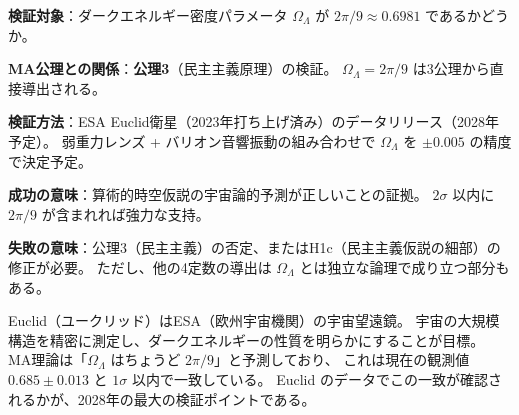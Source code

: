 \begin{experimentbox}[Euclid 2028 $\to$ $\Omega_\Lambda = 2\pi/9$（公理3の検証）]
\textbf{検証対象}：ダークエネルギー密度パラメータ $\Omega_\Lambda$ が
$2\pi/9 \approx 0.6981$ であるかどうか。

\medskip
\textbf{MA公理との関係}：\textbf{公理3}（民主主義原理）の検証。
$\Omega_\Lambda = 2\pi/9$ は3公理から直接導出される。

\medskip
\textbf{検証方法}：ESA Euclid衛星（2023年打ち上げ済み）のデータリリース（2028年予定）。
弱重力レンズ + バリオン音響振動の組み合わせで $\Omega_\Lambda$ を $\pm 0.005$ の精度で決定予定。

\medskip
\textbf{成功の意味}：算術的時空仮説の宇宙論的予測が正しいことの証拠。
$2\sigma$ 以内に $2\pi/9$ が含まれれば強力な支持。

\medskip
\textbf{失敗の意味}：公理3（民主主義）の否定、またはH1c（民主主義仮説の細部）の修正が必要。
ただし、他の4定数の導出は $\Omega_\Lambda$ とは独立な論理で成り立つ部分もある。
\end{experimentbox}

\begin{hsbox}
Euclid（ユークリッド）はESA（欧州宇宙機関）の宇宙望遠鏡。
宇宙の大規模構造を精密に測定し、ダークエネルギーの性質を明らかにすることが目標。
MA理論は「$\Omega_\Lambda$ はちょうど $2\pi/9$」と予測しており、
これは現在の観測値 $0.685 \pm 0.013$ と $1\sigma$ 以内で一致している。
Euclid のデータでこの一致が確認されるかが、2028年の最大の検証ポイントである。
\end{hsbox}
